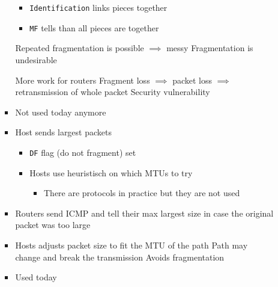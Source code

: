 \begin{itemize}
\begin{itemize}
\begin{itemize}
                        \begin{itemize}
                            \item \verb+Identification+ links pieces together
                            \item \verb+MF+ tells than all pieces are together
                        \end{itemize}
                    \icon Repeated fragmentation is possible $\implies$ messy
                    \icon Fragmentation is undesirable
                        \begin{itemize}
                            \icon More work for routers
                            \icon Fragment loss $\implies$ packet loss $\implies$ retransmission of whole packet
                            \icon Security vulnerability
                        \end{itemize}
                    \item Not used today anymore
                \end{itemize}
                \begin{itemize}
                    \item Host sends largest packets
                        \begin{itemize}
                            \item \verb+DF+ flag (do not fragment) set
                            \item Hosts use heuristisch on which MTUs to try
                                \begin{itemize}
                                    \item There are protocols in practice but they are not used
                                \end{itemize}
                        \end{itemize}
                    \item Routers send ICMP and tell their max largest size in case the original packet was too large
                    \item Hosts adjusts packet size to fit the MTU of the path
                    \icon Path may change and break the transmission
                    \ipro Avoids fragmentation
                    \item Used today
                \end{itemize}
        \end{itemize}
\end{itemize}

